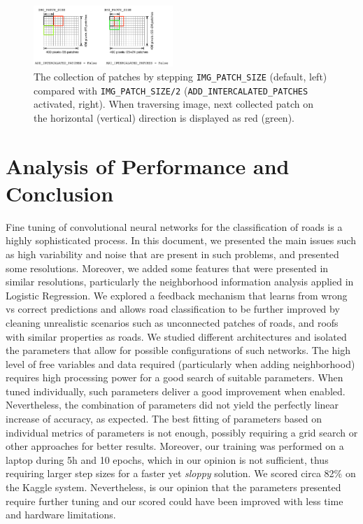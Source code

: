\documentclass[fleqn,9 pt]{SelfArx} %
\begin{document}
\begin{sloppypar}
\begin{figure}[H]
\centering
\includegraphics[width=0.47\textwidth]{figures/ADD_INTERCALATED_PATCHES.pdf}
\caption{The collection of patches by stepping \texttt{IMG\_PATCH\_SIZE} (default, left) compared with \texttt{IMG\_PATCH\_SIZE/2} (\texttt{ADD\_INTERCALATED\_PATCHES} activated, right). When traversing image, next collected patch on the horizontal (vertical) direction is displayed as red (green).}
\end{figure}

\section{Analysis of Performance and Conclusion}
\label{sec-conclusion}

Fine tuning of convolutional neural networks for the classification of roads is a highly sophisticated process. In this document, we presented the main issues such as high variability and noise that are present in such problems, and presented some resolutions. Moreover, we added some features that were presented in similar resolutions, particularly the neighborhood information analysis applied in Logistic Regression. We explored a feedback mechanism that learns from wrong vs correct predictions and allows road classification to be further improved by cleaning unrealistic scenarios such as unconnected patches of roads, and roofs with similar properties as roads. We studied different architectures and isolated the parameters that allow for possible configurations of such networks. The high level of free variables and data required (particularly when adding neighborhood) requires high processing power for a good search of suitable parameters. When tuned individually, such parameters deliver a good improvement when enabled. Nevertheless, the combination of parameters did not yield the perfectly linear increase of accuracy, as expected. The best fitting of parameters based on individual metrics of parameters is not enough, possibly requiring a grid search or other approaches for better results. Moreover, our training was performed on a laptop during 5h and 10 epochs, which in our opinion is not sufficient, thus requiring larger step sizes for a faster yet \textit{sloppy} solution. We scored circa 82\% on the Kaggle system. Nevertheless, is our opinion that the parameters presented require further tuning and our scored could have been improved with less time and hardware limitations.




\end{sloppypar}
\end{document}
